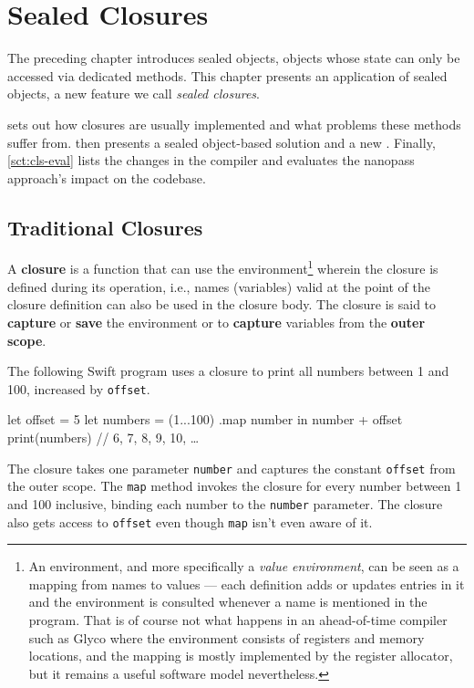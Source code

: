 \documentclass[main.tex]{subfiles}
\begin{document}
\onlyinsubfile{\mainmatter{}}

\chapter{Sealed Closures} \label{ch:cls}
The preceding chapter introduces sealed objects, objects whose state can only be accessed via dedicated methods. This chapter presents an application of sealed objects, a new feature we call \emph{sealed closures}.

 sets out how closures are usually implemented and what problems these methods suffer from.  then presents a sealed object-based solution and a new . Finally, \cref{sct:cls-eval} lists the changes in the compiler and evaluates the nanopass approach's impact on the codebase.

\section{Traditional Closures} \label{sct:cls-trad}
A \textbf{closure} is a function that can use the environment\footnote{An environment, and more specifically a \emph{value environment}, can be seen as a mapping from names to values — each definition adds or updates entries in it and the environment is consulted whenever a name is mentioned in the program. That is of course not what happens in an ahead-of-time compiler such as Glyco where the environment consists of registers and memory locations, and the mapping is mostly implemented by the register allocator, but it remains a useful software model nevertheless.} wherein the closure is defined during its operation, i.e., names (variables) valid at the point of the closure definition can also be used in the closure body. The closure is said to \textbf{capture} or \textbf{save} the environment or to \textbf{capture} variables from the \textbf{outer scope}.

The following Swift program uses a closure to print all numbers between 1 and 100, increased by \texttt{offset}.
\begin{swift}
	let offset = 5
	let numbers = (1...100)
		.map { number in number + offset }
	print(numbers)		// 6, 7, 8, 9, 10, …
\end{swift}
The closure takes one parameter \texttt{number} and captures the constant \texttt{offset} from the outer scope. The \texttt{map} method invokes the closure for every number between 1 and 100 inclusive, binding each number to the \texttt{number} parameter. The closure also gets access to \texttt{offset} even though \texttt{map} isn't even aware of it.
\end{document}
